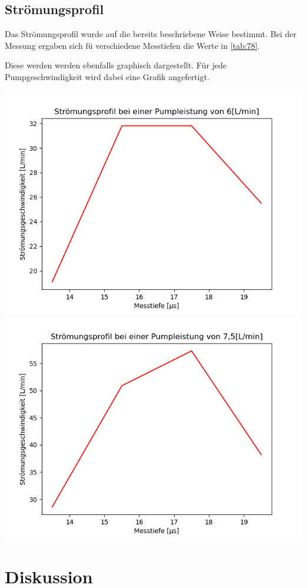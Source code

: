 \documentclass[titlepage=firstcover, captions=tableheading]{scrartcl}
\begin{document}
\subsection{Strömungsprofil}

Das Strömungsprofil wurde auf die bereits beschriebene Weise bestimmt.
Bei der Messung ergaben sich fü verschiedene Messtiefen die Werte in \ref{tab:78}.

\noindent Diese werden werden ebenfalls graphisch dargestellt. Für jede Pumpgeschwindigkeit wird dabei eine Grafik angefertigt.

\includegraphics{4.png}
\includegraphics{5.png}

\section{Diskussion}
\end{document}
